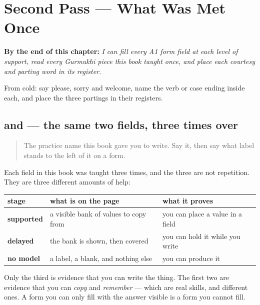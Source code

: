
\chapter{Second Pass --- What Was Met Once}
\label{ch:pa-doosra-gera}

\begin{chapteropening}
\textbf{By the end of this chapter:} \emph{I can fill every A1 form field at each level of support, read every Gurmukhi piece this book taught once, and place each courtesy and parting word in its register.}

From cold: say please, sorry and welcome, name the verb or case ending inside each, and place the three partings in their registers.
\end{chapteropening}

\section[\texorpdfstring{\pa{ਨਾਂ} · \pa{ਭਾਸ਼ਾ} (nāṁ · bhāshā)}{ਨਾਂ · ਭਾਸ਼ਾ (nāṁ · bhāshā)}]{ and  — the same two fields, three times over}

\label{lesson:PA-R48-forms-name-and-language}



\begin{quote}
The practice name this book gave you to write. Say it, then say what label stands to the left of it on a form.
\end{quote}

\begin{culture}
Each field in this book was taught three times, and the three are not repetition. They are three different amounts of help:

\noindent
\begin{tabularx}{\linewidth}{@{}>{\raggedright\arraybackslash}X>{\raggedright\arraybackslash}X>{\raggedright\arraybackslash}X@{}}
\toprule
\textbf{stage} & \textbf{what is on the page} & \textbf{what it proves} \\
\midrule
\textbf{supported} & a visible bank of values to copy from & you can place a value in a field \\
\textbf{delayed} & the bank is shown, then covered & you can hold it while you write \\
\textbf{no model} & a label, a blank, and nothing else & you can produce it \\
\bottomrule
\end{tabularx}

Only the third is evidence that you can write the thing. The first two are evidence that you can \emph{copy} and \emph{remember} — which are real skills, and different ones. A form you can only fill with the answer visible is a form you cannot fill.
\end{culture}

